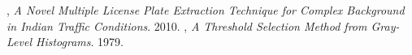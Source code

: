\documentclass[a4paper,10pt,twocolumn]{article}
\begin{document}
\begin{thebibliography}{9}
  , 
  \emph{A Novel Multiple License Plate Extraction Technique for Complex Background in Indian Traffic Conditions}.
  2010.
  , 
  \emph{A Threshold Selection Method from Gray-Level Histograms}.
  1979.  

\end{thebibliography}
\end{document}
